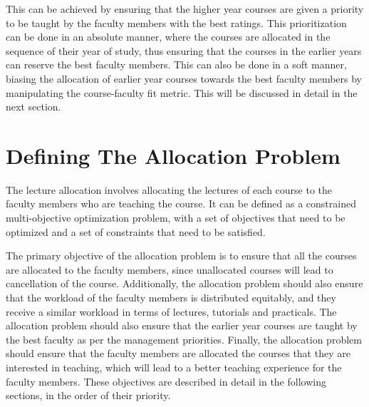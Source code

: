 This can be achieved by ensuring that the higher year courses are given a priority to be taught by the faculty members with the best ratings. This prioritization can be done in an absolute manner, where the courses are allocated in the sequence of their year of study, thus ensuring that the courses in the earlier years can reserve the best faculty members. This can also be done in a soft manner, biasing the allocation of earlier year courses towards the best faculty members by manipulating the course-faculty fit metric. This will be discussed in detail in the next section.

\section{Defining The Allocation Problem}
\label{sec:defining_the_allocation_problem}

The lecture allocation involves allocating the lectures of each course to the faculty members who are teaching the course. It can be defined as a constrained multi-objective optimization problem, with a set of objectives that need to be optimized and a set of constraints that need to be satisfied.

The primary objective of the allocation problem is to ensure that all the courses are allocated to the faculty members, since unallocated courses will lead to cancellation of the course. Additionally, the allocation problem should also ensure that the workload of the faculty members is distributed equitably, and they receive a similar workload in terms of lectures, tutorials and practicals. The allocation problem should also ensure that the earlier year courses are taught by the best faculty as per the management priorities. Finally, the allocation problem should ensure that the faculty members are allocated the courses that they are interested in teaching, which will lead to a better teaching experience for the faculty members. These objectives are described in detail in the following sections, in the order of their priority.

